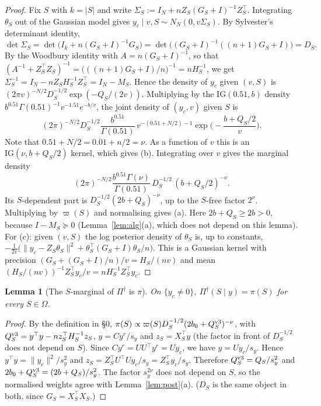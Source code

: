 \documentclass[11pt]{article}
\newtheorem{lemma}[theorem]{Lemma}
\theoremstyle{remark}
\newcommand{\Pd}{\Pi^\dagger}
\newcommand{\vp}{\varpi}
\newcommand{\IG}{\mathrm{IG}}
\begin{document}
\begin{proof}
Fix $S$ with $k=|S|$ and write $\Sigma_S:=I_N+nZ_S(G_S+I)^{-1}Z_S^\top$. Integrating $\theta_S$ out of the Gaussian model gives $y_c\mid v,S\sim N_N(0,v\Sigma_S)$. By Sylvester's determinant identity,
\[
\det\Sigma_S=\det\big(I_k+n(G_S+I)^{-1}G_S\big)=\det\big((G_S+I)^{-1}((n+1)G_S+I)\big)=D_S .
\]
By the Woodbury identity with $A=n(G_S+I)^{-1}$, so that $(A^{-1}+Z_S^\top Z_S)^{-1}=\big(((n+1)G_S+I)/n\big)^{-1}=nH_S^{-1}$, we get $\Sigma_S^{-1}=I_N-nZ_SH_S^{-1}Z_S^\top=I_N-M_S$. Hence the density of $y_c$ given $(v,S)$ is $(2\pi v)^{-N/2}D_S^{-1/2}\exp(-Q_S/(2v))$. Multiplying by the $\IG(0.51,b)$ density $b^{0.51}\Gamma(0.51)^{-1}v^{-1.51}e^{-b/v}$, the joint density of $(y_c,v)$ given $S$ is
\[
(2\pi)^{-N/2}D_S^{-1/2}\frac{b^{0.51}}{\Gamma(0.51)}\,v^{-(0.51+N/2)-1}\exp\Big(-\frac{b+Q_S/2}{v}\Big).
\]
Note that $0.51+N/2=0.01+n/2=\nu$. As a function of $v$ this is an $\IG(\nu,b+Q_S/2)$ kernel, which gives (b). Integrating over $v$ gives the marginal density
\[
(2\pi)^{-N/2}\frac{b^{0.51}\Gamma(\nu)}{\Gamma(0.51)}\,D_S^{-1/2}\,(b+Q_S/2)^{-\nu}.
\]
Its $S$-dependent part is $D_S^{-1/2}(2b+Q_S)^{-\nu}$, up to the $S$-free factor $2^{\nu}$. Multiplying by $\vp(S)$ and normalising gives (a). Here $2b+Q_S\ge2b>0$, because $I-M_S\succeq0$ (Lemma~\ref{lem:alg}(a), which does not depend on this lemma). For (c): given $(v,S)$ the log posterior density of $\theta_S$ is, up to constants, $-\frac1{2v}\big(\|y_c-Z_S\theta_S\|^2+\theta_S^\top(G_S+I)\theta_S/n\big)$. This is a Gaussian kernel with precision $(G_S+(G_S+I)/n)/v=H_S/(nv)$ and mean $(H_S/(nv))^{-1}Z_S^\top y_c/v=nH_S^{-1}Z_S^\top y_c$.
\end{proof}

\begin{lemma}[The $S$-marginal of $\Pd$ is $\pi$]\label{lem:marg}
On $\{y_c\ne0\}$, $\Pd(S\mid y)=\pi(S)$ for every $S\in\Omega$.
\end{lemma}

\begin{proof}
By the definition in \S0, $\pi(S)\propto\vp(S)D_S^{-1/2}(2b_0+Q^{\rm v3}_S)^{-\nu}$, with $Q^{\rm v3}_S=y^\top y-nz_S^\top H_S^{-1}z_S$, $y=Cy^r/s_y$ and $z_S=X_S^\top y$ (the factor in front of $D_S^{-1/2}$ does not depend on $S$). Since $Cy^r=UU^\top y^r=Uy_c$, we have $y=Uy_c/s_y$. Hence $y^\top y=\|y_c\|^2/s_y^2$ and $z_S=Z_S^\top U^\top Uy_c/s_y=Z_S^\top y_c/s_y$. Therefore $Q^{\rm v3}_S=Q_S/s_y^2$ and $2b_0+Q^{\rm v3}_S=(2b+Q_S)/s_y^2$. The factor $s_y^{2\nu}$ does not depend on $S$, so the normalised weights agree with Lemma~\ref{lem:post}(a). ($D_S$ is the same object in both, since $G_S=X_S^\top X_S$.)
\end{proof}
\end{document}

